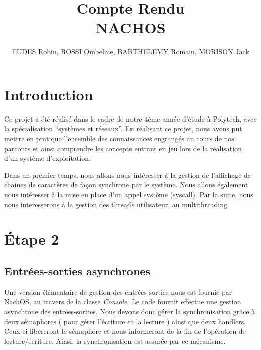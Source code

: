 \documentclass[a4paper,10pt]{article}
\title{Compte Rendu \\ NACHOS}
\author{EUDES Robin, ROSSI Ombeline, BARTHELEMY Romain, MORISON Jack}
\begin{document}
\maketitle
\tableofcontents
\newpage
\section{Introduction}
Ce projet a été réalisé dans le cadre de notre 4ème année d'étude à Polytech, avec la spécialisation ``systèmes et réseaux''.
En réalisant ce projet, nous avons put mettre en pratique l'ensemble des connaissances engrangés au cours de nos parcours et ainsi
comprendre les concepts entrant en jeu lors de la réalisation d'un système d'exploitation.
\vspace{0.5cm}

Dans un premier temps, nous allons nous intéresser
à la gestion de l'affichage de chaines de caractères de façon synchrone par le système. Nous allons également nous intéresser à la mise en place
d'un appel système (syscall). Par la suite, nous nous interesserons à la gestion des threads utilisateur, au multithreading.
\newpage
\section{Étape 2}
\subsection{Entrées-sorties asynchrones}
Une version élémentaire de gestion des entrées-sorties nous est fournie par NachOS, au travers de la classe \textit{Console}. Le code fournit
effectue une  gestion asynchrone des entrées-sorties. Nous devons donc gérer la synchronisation grâce à deux sémaphores ( pour gérer l'écriture et la lecture )
ainsi que deux handlers. Ceux-ci libèreront le sémaphore et nous informeront de la fin de l'opération de lecture/écriture. Ainsi, la synchronisation est assurée
par ce mécanisme.
\end{document}
